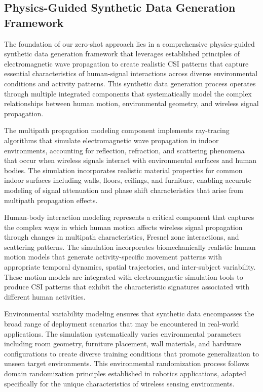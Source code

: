 \documentclass[journal]{IEEEtran}
\begin{document}
\subsection{Physics-Guided Synthetic Data Generation Framework}

The foundation of our zero-shot approach lies in a comprehensive physics-guided synthetic data generation framework that leverages established principles of electromagnetic wave propagation to create realistic CSI patterns that capture essential characteristics of human-signal interactions across diverse environmental conditions and activity patterns. This synthetic data generation process operates through multiple integrated components that systematically model the complex relationships between human motion, environmental geometry, and wireless signal propagation.

The multipath propagation modeling component implements ray-tracing algorithms that simulate electromagnetic wave propagation in indoor environments, accounting for reflection, refraction, and scattering phenomena that occur when wireless signals interact with environmental surfaces and human bodies. The simulation incorporates realistic material properties for common indoor surfaces including walls, floors, ceilings, and furniture, enabling accurate modeling of signal attenuation and phase shift characteristics that arise from multipath propagation effects.

Human-body interaction modeling represents a critical component that captures the complex ways in which human motion affects wireless signal propagation through changes in multipath characteristics, Fresnel zone interactions, and scattering patterns. The simulation incorporates biomechanically realistic human motion models that generate activity-specific movement patterns with appropriate temporal dynamics, spatial trajectories, and inter-subject variability. These motion models are integrated with electromagnetic simulation tools to produce CSI patterns that exhibit the characteristic signatures associated with different human activities.

Environmental variability modeling ensures that synthetic data encompasses the broad range of deployment scenarios that may be encountered in real-world applications. The simulation systematically varies environmental parameters including room geometry, furniture placement, wall materials, and hardware configurations to create diverse training conditions that promote generalization to unseen target environments. This environmental randomization process follows domain randomization principles established in robotics applications, adapted specifically for the unique characteristics of wireless sensing environments.
\end{document}
